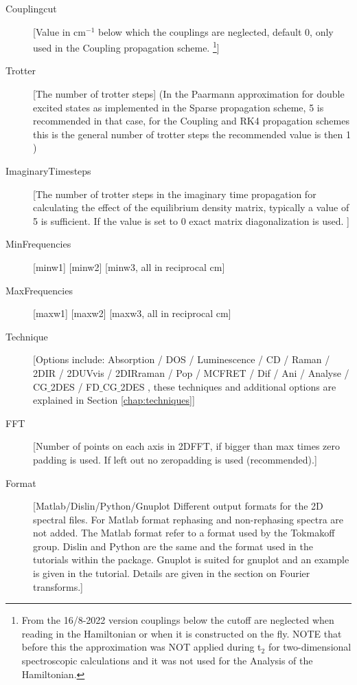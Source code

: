 \begin{description}
\item [Couplingcut] [Value in cm$^{-1}$ below which the couplings are neglected, default 0, only used in the Coupling propagation scheme. \footnote{From the 16/8-2022 version couplings below the cutoff are neglected when reading in the Hamiltonian or when it is constructed on the fly. NOTE that before this the approximation was NOT applied during t$_2$ for two-dimensional spectroscopic calculations and it was not used for the Analysis of the Hamiltonian.}]
\item [Trotter] [The number of trotter steps] (In the Paarmann approximation for double excited 
states as implemented in the Sparse propagation scheme, 5 is recommended in that case, for the Coupling and RK4 propagation schemes this is the general number of trotter steps the recommended value is then 1 )
\item [ImaginaryTimesteps] [The number of trotter steps in the imaginary time propagation for calculating the effect of the equilibrium density matrix, typically a value of 5 is sufficient. If the value is set to 0 exact matrix diagonalization is used. ]
\item [MinFrequencies] [minw1] [minw2] [minw3, all in reciprocal cm]
\item [MaxFrequencies] [maxw1] [maxw2] [maxw3, all in reciprocal cm]
\item [Technique] [Options include: Absorption / DOS / Luminescence / CD / Raman / 2DIR / 2DUVvis / 2DIRraman / Pop / MCFRET / Dif /
 Ani / Analyse / CG$\_$2DES / FD$\_$CG$\_$2DES , these techniques and additional options are explained in Section \ref{chap:techniques}]
\item [FFT] [Number of points on each axis in 2DFFT, if bigger than max times zero padding is used. If left out no zeropadding is used (recommended).]
\item [Format] [Matlab/Dislin/Python/Gnuplot Different output formats for the 2D spectral files. For Matlab format rephasing and non-rephasing spectra are not added. The Matlab format refer to a format used by the Tokmakoff group. Dislin and Python are the same and the format used in the tutorials within the package. Gnuplot is suited for gnuplot and an example is given in the tutorial. Details are given in the section on Fourier transforms.] 

\end{description}
